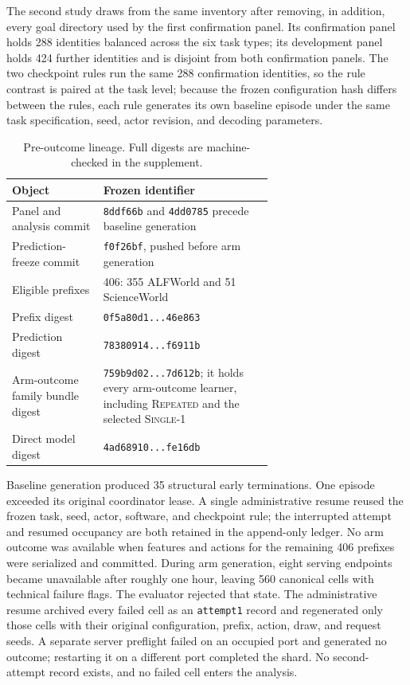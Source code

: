 The second study draws from the same inventory after removing, in addition, every goal directory used by the first confirmation panel. Its confirmation panel holds 288 identities balanced across the six task types; its development panel holds 424 further identities and is disjoint from both confirmation panels. The two checkpoint rules run the same 288 confirmation identities, so the rule contrast is paired at the task level; because the frozen configuration hash differs between the rules, each rule generates its own baseline episode under the same task specification, seed, actor revision, and decoding parameters.

\begin{table}[ht]
\caption{Pre-outcome lineage. Full digests are machine-checked in the supplement.}
\label{tab:lineage}
\centering
\small
\begin{tabular}{@{}lp{0.65\linewidth}@{}}
\toprule
Object & Frozen identifier \\
\midrule
Panel and analysis commit & \texttt{8ddf66b} and \texttt{4dd0785} precede baseline generation \\
Prediction-freeze commit & \texttt{f0f26bf}, pushed before arm generation \\
Eligible prefixes & 406: 355 ALFWorld and 51 ScienceWorld \\
Prefix digest & \texttt{0f5a80d1...46e863} \\
Prediction digest & \texttt{78380914...f6911b} \\
Arm-outcome family bundle digest & \texttt{759b9d02...7d612b}; it holds every arm-outcome learner, including \textsc{Repeated} and the selected \textsc{Single-1} \\
Direct model digest & \texttt{4ad68910...fe16db} \\
\bottomrule
\end{tabular}
\end{table}

Baseline generation produced 35 structural early terminations. One episode exceeded its original coordinator lease. A single administrative resume reused the frozen task, seed, actor, software, and checkpoint rule; the interrupted attempt and resumed occupancy are both retained in the append-only ledger. No arm outcome was available when features and actions for the remaining 406 prefixes were serialized and committed. During arm generation, eight serving endpoints became unavailable after roughly one hour, leaving 560 canonical cells with technical failure flags. The evaluator rejected that state. The administrative resume archived every failed cell as an \texttt{attempt1} record and regenerated only those cells with their original configuration, prefix, action, draw, and request seeds. A separate server preflight failed on an occupied port and generated no outcome; restarting it on a different port completed the shard. No second-attempt record exists, and no failed cell enters the analysis.

